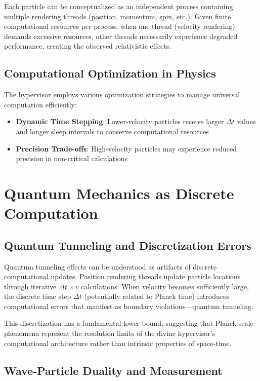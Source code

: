 \documentclass[12pt,a4paper]{article}
\begin{document}
Each particle can be conceptualized as an independent process containing multiple rendering threads (position, momentum, spin, etc.). Given finite computational resources per process, when one thread (velocity rendering) demands excessive resources, other threads necessarily experience degraded performance, creating the observed relativistic effects.

\subsection{Computational Optimization in Physics}

The hypervisor employs various optimization strategies to manage universal computation efficiently:

\begin{itemize}
    \item \textbf{Dynamic Time Stepping}: Lower-velocity particles receive larger $\Delta t$ values and longer sleep intervals to conserve computational resources
    \item \textbf{Precision Trade-offs}: High-velocity particles may experience reduced precision in non-critical calculations
\end{itemize}

\section{Quantum Mechanics as Discrete Computation}

\subsection{Quantum Tunneling and Discretization Errors}

Quantum tunneling effects can be understood as artifacts of discrete computational updates. Position rendering threads update particle locations through iterative $\Delta t \times v$ calculations. When velocity becomes sufficiently large, the discrete time step $\Delta t$ (potentially related to Planck time) introduces computational errors that manifest as boundary violations—quantum tunneling.

This discretization has a fundamental lower bound, suggesting that Planck-scale phenomena represent the resolution limits of the divine hypervisor's computational architecture rather than intrinsic properties of space-time.

\subsection{Wave-Particle Duality and Measurement}
\end{document}

